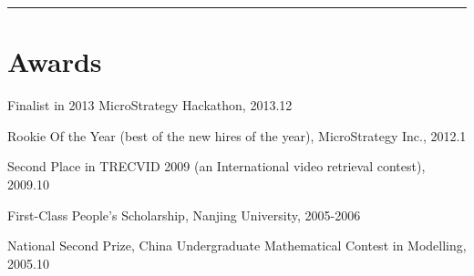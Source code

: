 \documentclass[letterpaper]{article}
\renewenvironment{itemize}{
\begin{list}{*}{
    \setlength{\leftmargin}{1.5em}
    \setlength{\itemsep}{0pt}
  }
}{
  \end{list}
}
\begin{document}
\rule{16.8cm}{0.1em}

\vspace{-1em}
\section*{Awards}
\begin{itemize}
\item Finalist in 2013 MicroStrategy Hackathon, 2013.12
\item Rookie Of the Year (best of the new hires of the year), MicroStrategy Inc., 2012.1
\item Second Place in TRECVID 2009 (an International video retrieval contest), 2009.10
\item First-Class People's Scholarship, Nanjing University, 2005-2006
\item National Second Prize, China Undergraduate Mathematical Contest in Modelling, 2005.10
\end{itemize}
\end{document}

